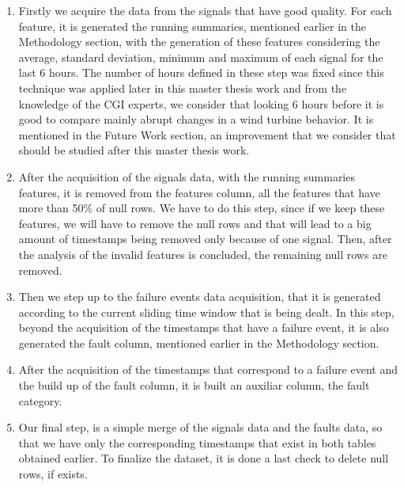 \begin{enumerate}
    \item 
Firstly we acquire the data from the signals that have good quality. For each feature, it is generated the running summaries, mentioned earlier in the Methodology section, with the generation of these features considering the average, standard deviation, minimum and maximum of each signal for the last 6 hours.
The number of hours defined in these step was fixed since this technique was applied later in this master thesis work and from the knowledge of the CGI experts, we consider that looking 6 hours before it is good to compare mainly abrupt changes in a wind turbine behavior.
It is mentioned in the Future Work section, an improvement that we consider that should be studied after this master thesis work.

    \item
After the acquisition of the signals data, with the running summaries features, it is removed from the features column, all the features that have more than 50\% of null rows. We have to do this step, since if we keep these features, we will have to remove the null rows and that will lead to a big amount of timestamps being removed only because of one signal.
Then, after the analysis of the invalid features is concluded, the remaining null rows are removed.

    \item
Then we step up to the failure events data acquisition, that it is generated according to the current sliding time window that is being dealt. In this step, beyond the acquisition of the timestamps that have a failure event, it is also generated the fault column, mentioned earlier in the Methodology section.

    \item
After the acquisition of the timestamps that correspond to a failure event and the build up of the fault column, it is built an auxiliar column, the fault category.

    \item
Our final step, is a simple merge of the signals data and the faults data, so that we have only the corresponding timestamps that exist in both tables obtained earlier. To finalize the dataset, it is done a last check to delete null rows, if exists.

\end{enumerate}


